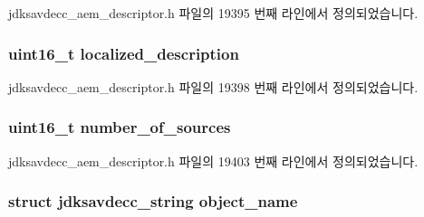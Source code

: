 jdksavdecc\+\_\+aem\+\_\+descriptor.\+h 파일의 19395 번째 라인에서 정의되었습니다.

\subsubsection[{\texorpdfstring{localized\+\_\+description}{localized_description}}]{\setlength{\rightskip}{0pt plus 5cm}uint16\+\_\+t localized\+\_\+description}\hypertarget{structjdksavdecc__descriptor__signal__selector_a0926f846ca65a83ad5bb06b4aff8f408}{}\label{structjdksavdecc__descriptor__signal__selector_a0926f846ca65a83ad5bb06b4aff8f408}


jdksavdecc\+\_\+aem\+\_\+descriptor.\+h 파일의 19398 번째 라인에서 정의되었습니다.

\subsubsection[{\texorpdfstring{number\+\_\+of\+\_\+sources}{number_of_sources}}]{\setlength{\rightskip}{0pt plus 5cm}uint16\+\_\+t number\+\_\+of\+\_\+sources}\hypertarget{structjdksavdecc__descriptor__signal__selector_a1af3a7f3729937d5da218737ba5b2483}{}\label{structjdksavdecc__descriptor__signal__selector_a1af3a7f3729937d5da218737ba5b2483}


jdksavdecc\+\_\+aem\+\_\+descriptor.\+h 파일의 19403 번째 라인에서 정의되었습니다.

\subsubsection[{\texorpdfstring{object\+\_\+name}{object_name}}]{\setlength{\rightskip}{0pt plus 5cm}struct {\bf jdksavdecc\+\_\+string} object\+\_\+name}\hypertarget{structjdksavdecc__descriptor__signal__selector_a7d1f5945a13863b1762fc6db74fa8f80}{}\label{structjdksavdecc__descriptor__signal__selector_a7d1f5945a13863b1762fc6db74fa8f80}


